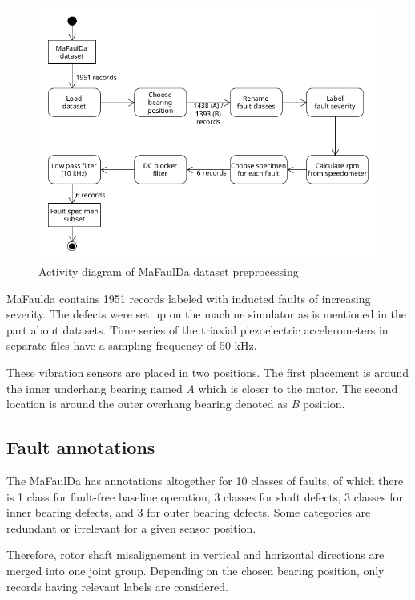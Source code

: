 \begin{figure}[ht]
	\centering
	\includegraphics[width=\textwidth]{assets/design/activity-data-exploration.png}
	\caption{Activity diagram of MaFaulDa dataset preprocessing}
	\label{fig:design:mafaulda-preprocessing}
\end{figure}

MaFaulda contains 1951 records labeled with inducted faults of increasing severity. The defects were set up on the machine simulator as is mentioned in the part about datasets. Time series of the triaxial piezoelectric accelerometers in separate files have a sampling frequency of 50 kHz. 

These vibration sensors are placed in two positions. The first placement is around the inner underhang bearing named \emph{A} which is closer to the motor. The second location is around the outer overhang bearing denoted as \emph{B} position.

\subsection{Fault annotations}
The MaFaulDa has annotations altogether for 10 classes of faults, of which there is 1 class for fault-free baseline operation, 3 classes for shaft defects, 3 classes for inner bearing defects, and 3 for outer bearing defects. Some categories are redundant or irrelevant for a given sensor position. 

Therefore, rotor shaft misalignement in vertical and horizontal directions are merged into one joint group. Depending on the chosen bearing position, only records having relevant labels are considered. 

